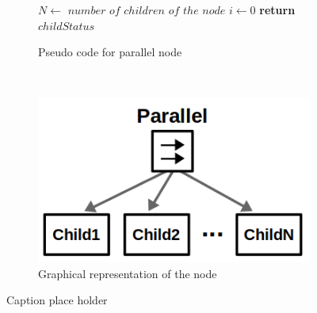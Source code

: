 \begin{figure}[H]
  \centering
  \begin{subfigure}[t]{0.6\textwidth}
      \begin{algorithm}[H]
        $N \gets $ $number$ $of$ $children$ $of$ $the$ $node$\;
        $i \gets 0$\;
        \textbf{return} $childStatus$
    \end{algorithm}
    
      \caption{Pseudo code for parallel node}\label{alg:par}
  \end{subfigure}%
  ~ 
  \begin{subfigure}[t]{0.3\textwidth}
      \centering
      \includegraphics{figs/bt_parallel_node.png}
      \caption{Graphical representation of the node}
      \label{fig:par}
  \end{subfigure}
  \caption{Caption place holder}
\end{figure}